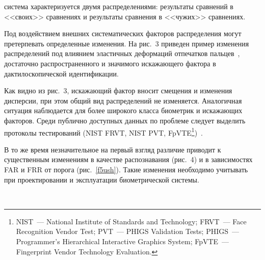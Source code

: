 \begin{multicols}{2}
\bigskip
\addtocounter{figure}{1}
    
\noindent
система характеризуется двумя распределениями: результаты 
сравнений в <<своих>> сравнениях и результаты сравнения в <<чужих>> сравнениях. 

 
     Под воздействием внешних систематических факторов распределения могут 
претерпевать определенные изменения. На рис.~3 приведен пример 
изменения распределений под влиянием эластичных деформаций отпечатков 
пальцев~\cite{9ush}, достаточно распространенного и значимого искажающего фактора 
в дактилоскопической идентификации. 
   
     Как видно из рис.~3, искажающий фактор вносит смещения и изменения 
дисперсии, при этом общий вид распределений не изменяется. Аналогичная ситуация 
наблюдается для более широкого класса биометрик и искажающих факторов. Среди 
публично доступных данных по проблеме следует выделить протоколы тестирований 
(NIST FRVT, NIST PVT, FpVTE\footnote{NIST~--- National Institute of Standards and Technology;
FRVT~--- Face Recognition Vendor Test;
PVT~--- PHIGS Validation Tests;
PHIGS~--- Programmer's Hierarchical Interactive Graphics System;
FpVTE~--- Fingerprint Vendor Technology Evaluation.})~\cite{10ush, 11ush}.

     
     В то же время незначительное на первый взгляд различие приводит к 
существенным изменениям в качестве распознавания (рис.~4) и в 
зависимостях FAR и FRR от порога (рис.~\ref{f5ush}). Такие изменения необходимо 
учитывать при проектировании и эксплуатации биометрической системы.

\begin{figure*} %
\vspace*{1pt}
\begin{center}
\vspace*{1pt}
\mbox{%
\epsfxsize=166.178mm %
}
\end{center}
\vspace*{-9pt}
\begin{minipage}[t]{81mm}
\end{minipage}
\hfill
\begin{minipage}[t]{81mm}
\end{minipage}
\end{figure*}


\end{multicols}
